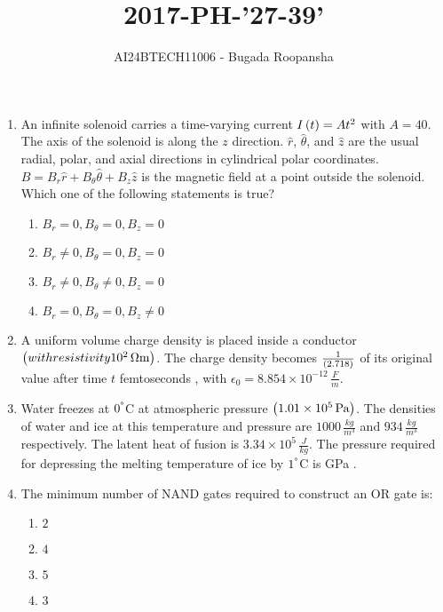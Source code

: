 \documentclass[journal,12pt,twocolumn]{IEEEtran}
\theoremstyle{remark}
\begin{document}

\vspace{3cm}
\title{2017-PH-'27-39'}
\author{AI24BTECH11006 - Bugada Roopansha}
\maketitle

\begin{enumerate}[start=27]
 
    \item 
    An infinite solenoid carries a time-varying current $I\left(t\right) = At^2$ with $A = 40$. The axis of the solenoid is along the $z$ direction. $\hat{r}$, $\hat{\theta}$, and $\hat{z}$ are the usual radial, polar, and axial directions in cylindrical polar coordinates. $B = B_r \hat{r} + B_\theta \hat{\theta} + B_z \hat{z}$ is the magnetic field at a point outside the solenoid. \\
    Which one of the following statements is true?
    \begin{enumerate}
        \item $B_r = 0, B_\theta = 0, B_z = 0$
        \item $B_r \neq 0, B_\theta = 0, B_z = 0$
        \item $B_r \neq 0, B_\theta \neq 0, B_z = 0$
        \item $B_r = 0, B_\theta = 0, B_z \neq 0$
    \end{enumerate}
    
    \item 

    A uniform volume charge density is placed inside a conductor $\left(with resistivity 10^2 \, \Omega \text{m}\right)$. The charge density becomes $\frac{1}{\left(2.718\right)}$ of its original value after time $t$ femtoseconds , with $\epsilon_0 = 8.854 \times 10^{-12} \, \frac{F}{m}$.
    
    \item 
    Water freezes at $0^\degree$C at atmospheric pressure $\left(1.01 \times 10^5 \, \text{Pa}\right)$. The densities of water and ice at this temperature and pressure are $1000 \, \frac {kg}{m^3}$ and $934 \, \frac{kg}{m^3}$ respectively. The latent heat of fusion is $3.34 \times 10^5 \, \frac{J}{kg}$. The pressure required for depressing the melting temperature of ice by $1^\degree$C is  GPa .
    
    \item 
    The minimum number of NAND gates required to construct an OR gate is:
    \begin{enumerate}
        \item $2$
        \item $4$
        \item $5$
        \item $3$
    \end{enumerate}
  

\end{enumerate}
\end{document}
